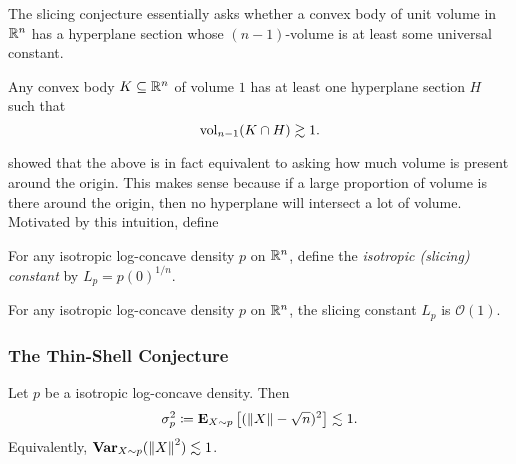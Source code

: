		The slicing conjecture essentially asks whether a convex body of unit volume in $\mathbb{R}^n$ has a hyperplane section whose $(n-1)$-volume is at least some universal constant.

		\begin{fcon}
			Any convex body $K\subseteq\mathbb{R}^n$ of volume $1$ has at least one hyperplane section $H$ such that
			\[ \operatorname{vol}_{n-1}(K \cap H) \gtrsim 1. \]
		\end{fcon}

		\cite{slicing-conjecture-equivalent} showed that the above is in fact equivalent to asking how much volume is present around the origin. This makes sense because if a large proportion of volume is there around the origin, then no hyperplane will intersect a lot of volume.\\
		Motivated by this intuition, define

		\begin{definition}
			For any isotropic log-concave density $p$ on $\mathbb{R}^n$, define the \textit{isotropic (slicing) constant} by $L_p = p(0)^{1/n}$.
		\end{definition}

		\begin{fcon}
			\label{slicing conjecture}
			For any isotropic log-concave density $p$ on $\mathbb{R}^n$, the slicing constant $L_p$ is $\mathcal{O}(1)$.
		\end{fcon}



	\subsubsection{The Thin-Shell Conjecture}

		\begin{fcon}
			\label{con: thin shell conjecture}
			Let $p$ be a isotropic log-concave density. Then
			\[ \sigma_p^2 \coloneqq \textbf{E}_{X\sim p}\left[(\left\lVert X\right\rVert-\sqrt{n})^2\right] \lesssim 1. \]
			Equivalently, $\operatorname{\textbf{Var}}_{X\sim p}(\left\lVert X\right\rVert^2) \lesssim 1$.
		\end{fcon}

